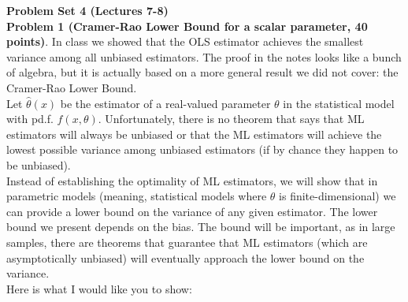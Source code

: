 \documentclass[11pt]{article} %
\begin{document}
\onehalfspace

\noindent \textbf{Problem Set 4 (Lectures 7-8)} \\

\noindent \textbf{Problem 1 (Cramer-Rao Lower Bound for a scalar parameter, 40 points)}. In class we showed that the OLS estimator achieves the smallest variance among all unbiased estimators. The proof in the notes looks like a bunch of algebra, but it is actually based on a more general result we did not cover: the Cramer-Rao Lower Bound.\\

\noindent Let $\widehat{\theta}(x)$ be the estimator of a real-valued parameter $\theta$ in the statistical model with pd.f. $f(x,\theta)$. Unfortunately, there is no theorem that says that ML estimators will always be unbiased or that the ML estimators will achieve the lowest possible variance among unbiased estimators (if by chance they happen to be unbiased). \\

\noindent Instead of establishing the optimality of ML estimators, we will show that in parametric models (meaning, statistical models where $\theta$ is finite-dimensional) we can provide a lower bound on the variance of any given estimator. The lower bound we present depends on the bias. The bound will be important, as in large samples, there are theorems that guarantee that ML estimators (which are asymptotically unbiased) will eventually approach the lower bound on the variance. \\

Here is what I would like you to show:
\end{document}
